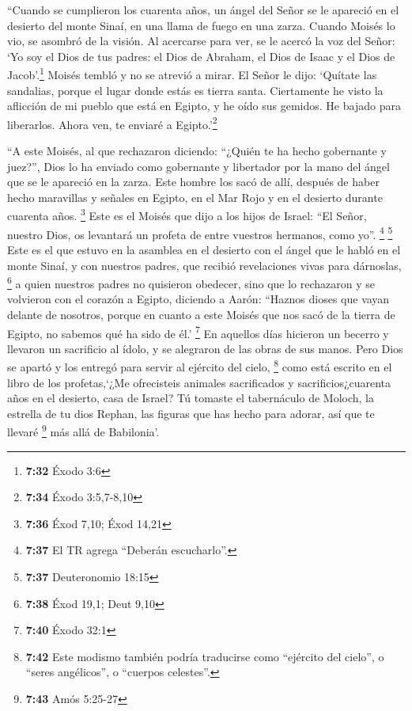  ``Cuando se cumplieron los cuarenta años, un ángel del
Señor se le apareció en el desierto del monte Sinaí, en una llama de
fuego en una zarza.  Cuando Moisés lo vio, se asombró de
la visión. Al acercarse para ver, se le acercó la voz del Señor:
 `Yo soy el Dios de tus padres: el Dios de Abraham, el
Dios de Isaac y el Dios de Jacob'.\footnote{\textbf{7:32} Éxodo 3:6}
Moisés tembló y no se atrevió a mirar.  El Señor le dijo:
`Quítate las sandalias, porque el lugar donde estás es tierra santa.
 Ciertamente he visto la aflicción de mi pueblo que está
en Egipto, y he oído sus gemidos. He bajado para liberarlos. Ahora ven,
te enviaré a Egipto.'\footnote{\textbf{7:34} Éxodo 3:5,7-8,10}

 ``A este Moisés, al que rechazaron diciendo: ``¿Quién te
ha hecho gobernante y juez?'', Dios lo ha enviado como gobernante y
libertador por la mano del ángel que se le apareció en la zarza.
 Este hombre los sacó de allí, después de haber hecho
maravillas y señales en Egipto, en el Mar Rojo y en el desierto durante
cuarenta años. \footnote{\textbf{7:36} Éxod 7,10; Éxod 14,21}
 Este es el Moisés que dijo a los hijos de Israel: ``El
Señor, nuestro Dios, os levantará un profeta de entre vuestros hermanos,
como yo''. \footnote{\textbf{7:37} El TR agrega ``Deberán escucharlo''.}
\footnote{\textbf{7:37} Deuteronomio 18:15}  Este es el
que estuvo en la asamblea en el desierto con el ángel que le habló en el
monte Sinaí, y con nuestros padres, que recibió revelaciones vivas para
dárnoslas, \footnote{\textbf{7:38} Éxod 19,1; Deut 9,10} 
a quien nuestros padres no quisieron obedecer, sino que lo rechazaron y
se volvieron con el corazón a Egipto,  diciendo a Aarón:
``Haznos dioses que vayan delante de nosotros, porque en cuanto a este
Moisés que nos sacó de la tierra de Egipto, no sabemos qué ha sido de
él.' \footnote{\textbf{7:40} Éxodo 32:1}  En aquellos
días hicieron un becerro y llevaron un sacrificio al ídolo, y se
alegraron de las obras de sus manos.  Pero Dios se apartó
y los entregó para servir al ejército del cielo, \footnote{\textbf{7:42}
  Este modismo también podría traducirse como ``ejército del cielo'', o
  ``seres angélicos'', o ``cuerpos celestes''.} como está escrito en el
libro de los profetas,`¿Me ofrecisteis animales sacrificados y
sacrificios¿cuarenta años en el desierto, casa de Israel?
 Tú tomaste el tabernáculo de Moloch, la estrella de tu
dios Rephan, las figuras que has hecho para adorar, así que te llevaré
\footnote{\textbf{7:43} Amós 5:25-27} más allá de Babilonia'.

